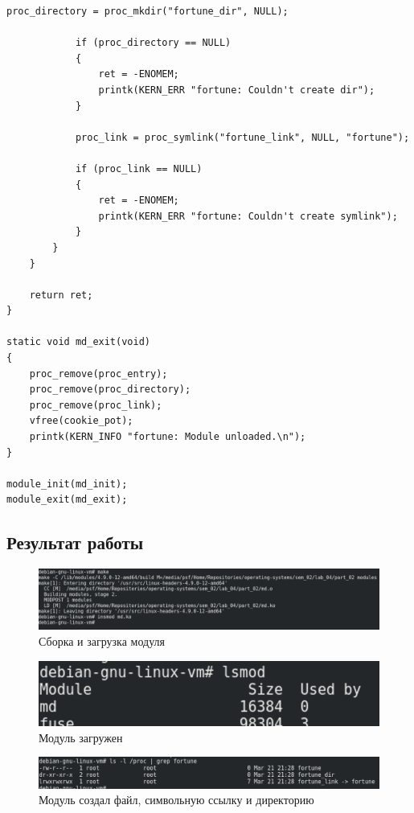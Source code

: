 \begin{lstlisting}[caption=Код модуля]
            proc_directory = proc_mkdir("fortune_dir", NULL);

            if (proc_directory == NULL)
            {
                ret = -ENOMEM;
                printk(KERN_ERR "fortune: Couldn't create dir");
            }

            proc_link = proc_symlink("fortune_link", NULL, "fortune");

            if (proc_link == NULL)
            {
                ret = -ENOMEM;
                printk(KERN_ERR "fortune: Couldn't create symlink");
            }
        }
    }

    return ret;
}

static void md_exit(void)
{
    proc_remove(proc_entry);
    proc_remove(proc_directory);
    proc_remove(proc_link);
    vfree(cookie_pot);
    printk(KERN_INFO "fortune: Module unloaded.\n");
}

module_init(md_init);
module_exit(md_exit);
\end{lstlisting}

\subsection{Результат работы}

\begin{figure}[H]
    \centering
    \includegraphics[scale=0.45]{img/part_02/make.png}
    \caption{Сборка и загрузка модуля}
\end{figure}

\begin{figure}[H]
    \centering
    \includegraphics{img/part_02/lsmod.png}
    \caption{Модуль загружен}
\end{figure}

\begin{figure}[H]
    \centering
    \includegraphics[scale=0.55]{img/part_02/ls.png}
    \caption{Модуль создал файл, символьную ссылку и директорию}
\end{figure}

